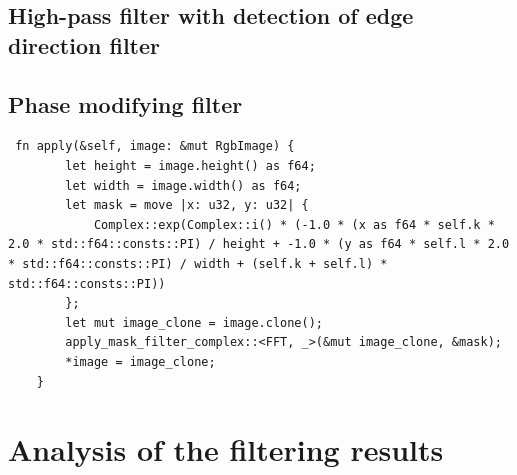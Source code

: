 \documentclass[12pt]{article}
\begin{document}
\subsection{High-pass filter with detection of edge direction filter}
\subsection{Phase modifying filter}
\begin{lstlisting}
 fn apply(&self, image: &mut RgbImage) {
        let height = image.height() as f64;
        let width = image.width() as f64;
        let mask = move |x: u32, y: u32| {
            Complex::exp(Complex::i() * (-1.0 * (x as f64 * self.k * 2.0 * std::f64::consts::PI) / height + -1.0 * (y as f64 * self.l * 2.0 * std::f64::consts::PI) / width + (self.k + self.l) * std::f64::consts::PI))
        };
        let mut image_clone = image.clone();
        apply_mask_filter_complex::<FFT, _>(&mut image_clone, &mask);
        *image = image_clone;
    }
\end{lstlisting}

\section{Analysis of the filtering results}
\end{document}
